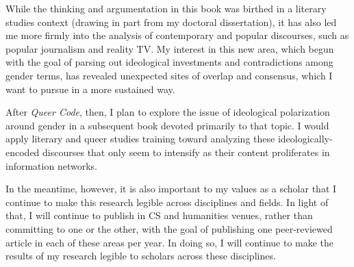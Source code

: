 \documentclass[12pt]{article}
\begin{document}
While the thinking and argumentation in this book was birthed in a
literary studies context (drawing in part from my doctoral
dissertation), it has also led me more firmly into the analysis of
contemporary and popular discourses, such as popular journalism and
reality TV. My interest in this new area, which begun with the goal of
parsing out ideological investments and contradictions among gender
terms, has revealed unexpected sites of overlap and consensus, which I
want to pursue in a more sustained way.

After \emph{Queer Code}, then, I plan to explore the issue of ideological
polarization around gender in a subsequent book devoted primarily to
that topic. I would apply literary and queer studies training toward
analyzing these ideologically-encoded discourses that only seem to
intensify as their content proliferates in information networks.

In the meantime, however, it is also important to my values as a
scholar that I continue to make this research legible across
disciplines and fields. In light of that, I will continue to publish
in CS and humanities venues, rather than committing to one or the
other, with the goal of publishing one peer-reviewed article in each
of these areas per year. In doing so, I will continue to make the
results of my research legible to scholars across these disciplines.
\end{document}
